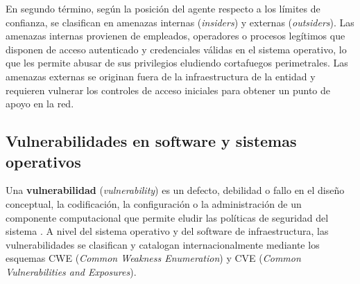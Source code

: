 \documentclass[12pt]{article}
\begin{document}
En segundo término, según la posición del agente respecto a los límites de confianza, se clasifican en amenazas internas (\textit{insiders}) y externas (\textit{outsiders}). Las amenazas internas provienen de empleados, operadores o procesos legítimos que disponen de acceso autenticado y credenciales válidas en el sistema operativo, lo que les permite abusar de sus privilegios eludiendo cortafuegos perimetrales. Las amenazas externas se originan fuera de la infraestructura de la entidad y requieren vulnerar los controles de acceso iniciales para obtener un punto de apoyo en la red.

\subsection{Vulnerabilidades en software y sistemas operativos}\label{subsec:vulnerabilidadesSoftwareSo}

Una \textbf{vulnerabilidad} (\textit{vulnerability}) es un defecto, debilidad o fallo en el diseño conceptual, la codificación, la configuración o la administración de un componente computacional que permite eludir las políticas de seguridad del sistema \parencite[\S 2, p.\ 322]{rfc4949}. A nivel del sistema operativo y del software de infraestructura, las vulnerabilidades se clasifican y catalogan internacionalmente mediante los esquemas CWE (\textit{Common Weakness Enumeration}) y CVE (\textit{Common Vulnerabilities and Exposures}).
\end{document}
